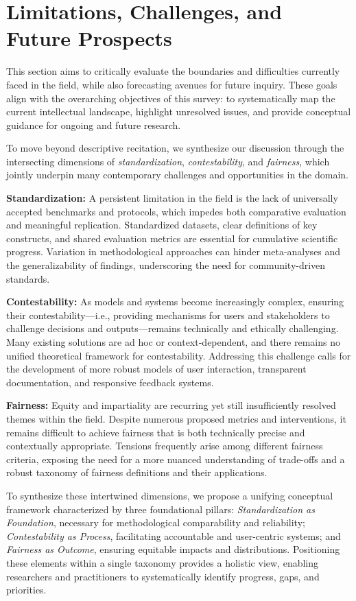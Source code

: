 \documentclass[sigconf]{acmart}
\begin{document}
\section{Limitations, Challenges, and Future Prospects}

This section aims to critically evaluate the boundaries and difficulties currently faced in the field, while also forecasting avenues for future inquiry. These goals align with the overarching objectives of this survey: to systematically map the current intellectual landscape, highlight unresolved issues, and provide conceptual guidance for ongoing and future research. 

To move beyond descriptive recitation, we synthesize our discussion through the intersecting dimensions of \textit{standardization}, \textit{contestability}, and \textit{fairness}, which jointly underpin many contemporary challenges and opportunities in the domain.

\textbf{Standardization:} A persistent limitation in the field is the lack of universally accepted benchmarks and protocols, which impedes both comparative evaluation and meaningful replication. Standardized datasets, clear definitions of key constructs, and shared evaluation metrics are essential for cumulative scientific progress. Variation in methodological approaches can hinder meta-analyses and the generalizability of findings, underscoring the need for community-driven standards.

\textbf{Contestability:} As models and systems become increasingly complex, ensuring their contestability—i.e., providing mechanisms for users and stakeholders to challenge decisions and outputs—remains technically and ethically challenging. Many existing solutions are ad hoc or context-dependent, and there remains no unified theoretical framework for contestability. Addressing this challenge calls for the development of more robust models of user interaction, transparent documentation, and responsive feedback systems.

\textbf{Fairness:} Equity and impartiality are recurring yet still insufficiently resolved themes within the field. Despite numerous proposed metrics and interventions, it remains difficult to achieve fairness that is both technically precise and contextually appropriate. Tensions frequently arise among different fairness criteria, exposing the need for a more nuanced understanding of trade-offs and a robust taxonomy of fairness definitions and their applications.

To synthesize these intertwined dimensions, we propose a unifying conceptual framework characterized by three foundational pillars: \textit{Standardization as Foundation}, necessary for methodological comparability and reliability; \textit{Contestability as Process}, facilitating accountable and user-centric systems; and \textit{Fairness as Outcome}, ensuring equitable impacts and distributions. Positioning these elements within a single taxonomy provides a holistic view, enabling researchers and practitioners to systematically identify progress, gaps, and priorities.
\end{document}
